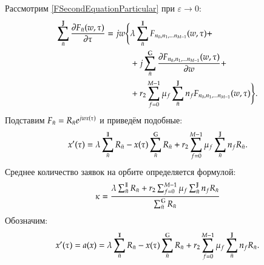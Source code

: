 Рассмотрим \eqref{FSecondEquationParticular} при \(\varepsilon \rightarrow 0\):
\begin{equation}\begin{aligned}
\sum_{\bar{n}}^{\mathbb{J}} \pdv{{F}_{\bar{n}}(w,\tau)}{\tau}=jw
\Bigg\{
    &\lambda \sum_{\bar{n}}^{\mathbb{I}} {F}_{{n}_0, {n}_1, ... {n}_{M-1}}(w,\tau)+\\
    &+j \sum_{\bar{n}}^{\mathbb{G}}\pdv{ {F}_{{n}_0, {n}_1, ... {n}_{M-1}} (w,\tau)}{w} + \\
    &+r_2\sum_{f=0}^{M-1} \mu_f \sum_{\bar{n}}^{\mathbb{J}} n_f {F}_{{n}_0, {n}_1, ... {n}_{M-1}}(w,\tau)
\Bigg\}
.
\end{aligned}\end{equation}
Подставим \({F}_{\bar{n}} = R_{\bar{n}} e^{jwx(\tau)}\) и приведём подобные:
\begin{equation}\begin{aligned}
x'(\tau)= 
    \lambda \sum_{\bar{n}}^{\mathbb{I}} R_{\bar{n}}
    -x(\tau) \sum_{\bar{n}}^{\mathbb{G}} R_{\bar{n}} 
    +r_2\sum_{f=0}^{M-1} \mu_f \sum_{\bar{n}}^{\mathbb{J}} n_f R_{\bar{n}}.
\end{aligned}\end{equation}
Среднее количество заявок на орбите определяется формулой:
\[\kappa = 
    \frac{\lambda \sum_{\bar{n}}^{\mathbb{I}} R_{\bar{n}} +r_2\sum_{f=0}^{M-1} \mu_f \sum_{\bar{n}}^{\mathbb{J}} n_f R_{\bar{n}} }
    {\sum_{\bar{n}}^{\mathbb{G}} R_{\bar{n}}}\]
Обозначим:
\begin{equation}\begin{aligned} \label{aDefinition}
x'(\tau) = a(x) = 
    \lambda \sum_{\bar{n}}^{\mathbb{I}} R_{\bar{n}}
    -x(\tau) \sum_{\bar{n}}^{\mathbb{G}} R_{\bar{n}} 
    +r_2\sum_{f=0}^{M-1} \mu_f \sum_{\bar{n}}^{\mathbb{J}} n_f R_{\bar{n}}.
\end{aligned}\end{equation}
